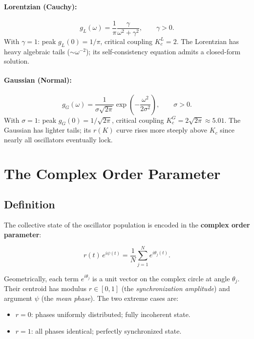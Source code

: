 \documentclass[12pt,a4paper]{article}
\begin{document}
\paragraph{Lorentzian (Cauchy):}
\begin{equation}
  g_L(\omega) = \frac{1}{\pi}\frac{\gamma}{\omega^2 + \gamma^2},
  \qquad \gamma > 0.
  \label{eq:lorentzian}
\end{equation}
With $\gamma = 1$: peak $g_L(0) = 1/\pi$, critical coupling
$K_c^L = 2$.
The Lorentzian has heavy algebraic tails ($\sim \omega^{-2}$);
its self-consistency equation admits a closed-form solution.

\paragraph{Gaussian (Normal):}
\begin{equation}
  g_G(\omega) = \frac{1}{\sigma\sqrt{2\pi}}
  \exp\!\left(-\frac{\omega^2}{2\sigma^2}\right),
  \qquad \sigma > 0.
  \label{eq:gaussian}
\end{equation}
With $\sigma = 1$: peak $g_G(0) = 1/\sqrt{2\pi}$, critical coupling
$K_c^G = 2\sqrt{2\pi} \approx 5.01$.
The Gaussian has lighter tails; its $r(K)$ curve rises more steeply
above $K_c$ since nearly all oscillators eventually lock.

\section{The Complex Order Parameter}
\label{sec:order}

\subsection{Definition}

The collective state of the oscillator population is encoded in the
\textbf{complex order parameter}:

\begin{mdframed}[style=keybox]
\begin{equation}
  r(t)\,e^{i\psi(t)} = \frac{1}{N}\sum_{j=1}^{N} e^{i\theta_j(t)}.
  \label{eq:OP}
\end{equation}
\end{mdframed}

Geometrically, each term $e^{i\theta_j}$ is a unit vector on the
complex circle at angle $\theta_j$.
Their centroid has modulus $r \in [0,1]$ (the \emph{synchronization
amplitude}) and argument $\psi$ (the \emph{mean phase}).
The two extreme cases are:
\begin{itemize}[leftmargin=2em, itemsep=2pt]
  \item $r = 0$: phases uniformly distributed; fully incoherent state.
  \item $r = 1$: all phases identical; perfectly synchronized state.
\end{itemize}
\end{document}
